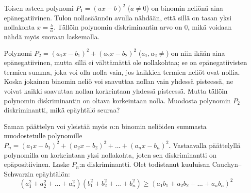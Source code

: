\begin{tehtava} %
Toisen asteen polynomi $P_1 = (ax-b)^2$ ($a \neq 0 $) on binomin neliönä aina epänegatiivinen. Tulon nollasäännön avulla nähdään, että sillä on tasan yksi nollakohta $x = \frac{b}{a}$. Tällöin polynomin diskriminantin arvo on 0, mikä voidaan nähdä myös suoraan laskemalla.

Polynomi $P_2 = (a_1x-b_1)^2+(a_2x-b_2)^2$ ($a_1,a_2 \neq $) on niin ikään aina epänegatiivinen, mutta sillä ei välttämättä ole nollakohtaa; se on epänegatiivisten termien summa, joka voi olla nolla vain, jos kaikkien termien neliöt ovat nollia. Koska jokainen binomin neliö voi saavuttaa nollan vain yhdessä pisteessä, ne voivat kaikki saavuttaa nollan korkeintaan yhdessä pisteessä. Mutta tällöin polynomin diskriminantin on oltava korkeintaan nolla. Muodosta polynomin $P_2$ diskriminantti, mikä epäyhtälö seuraa?

Saman päättelyn voi yleistää myös $n$:n binomin neliöiden summasta muodostetulle polynomille $P_n = (a_1x-b_1)^2+(a_2x-b_2)^2+\ldots+(a_nx-b_n)^2$. Vastaavalla päättelyllä polynomilla on korkeintaan yksi nollakohta, joten sen diskriminantti on epäpositiivinen. Laske $P_n$:n diskriminantti. Olet todistanut kuuluisan Cauchyn--Schwarzin epäyhtälön:
\[
(a_1^2+a_2^2+\ldots+a_n^2)(b_1^2+b_2^2+\ldots+b_n^2) \geq (a_1b_1+a_2b_2+\ldots+a_nb_n)^2
\]

\end{tehtava}